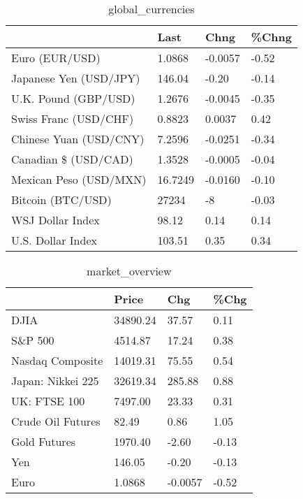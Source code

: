\documentclass{article}%
\begin{document}
%


\begin{table}[htbp]%
\caption{global\_currencies}%
\centering%
\begin{adjustbox}{width=1\textwidth}%
\begin{tabular}{llll}
\toprule
                       &    Last &    Chng & \%Chng \\
\midrule
        Euro (EUR/USD) &  1.0868 & -0.0057 & -0.52 \\
Japanese Yen (USD/JPY) &  146.04 &   -0.20 & -0.14 \\
  U.K. Pound (GBP/USD) &  1.2676 & -0.0045 & -0.35 \\
 Swiss Franc (USD/CHF) &  0.8823 &  0.0037 &  0.42 \\
Chinese Yuan (USD/CNY) &  7.2596 & -0.0251 & -0.34 \\
  Canadian \$ (USD/CAD) &  1.3528 & -0.0005 & -0.04 \\
Mexican Peso (USD/MXN) & 16.7249 & -0.0160 & -0.10 \\
     Bitcoin (BTC/USD) &   27234 &      -8 & -0.03 \\
      WSJ Dollar Index &   98.12 &    0.14 &  0.14 \\
     U.S. Dollar Index &  103.51 &    0.35 &  0.34 \\
\bottomrule
\end{tabular}
%
\end{adjustbox}%
\end{table}

%


\begin{table}[htbp]%
\caption{market\_overview}%
\centering%
\begin{adjustbox}{width=1\textwidth}%
\begin{tabular}{llll}
\toprule
                  &    Price &     Chg &  \%Chg \\
\midrule
             DJIA & 34890.24 &   37.57 &  0.11 \\
          S\&P 500 &  4514.87 &   17.24 &  0.38 \\
 Nasdaq Composite & 14019.31 &   75.55 &  0.54 \\
Japan: Nikkei 225 & 32619.34 &  285.88 &  0.88 \\
     UK: FTSE 100 &  7497.00 &   23.33 &  0.31 \\
Crude Oil Futures &    82.49 &    0.86 &  1.05 \\
     Gold Futures &  1970.40 &   -2.60 & -0.13 \\
              Yen &   146.05 &   -0.20 & -0.13 \\
             Euro &   1.0868 & -0.0057 & -0.52 \\
\bottomrule
\end{tabular}
%
\end{adjustbox}%
\end{table}

%
\end{document}
